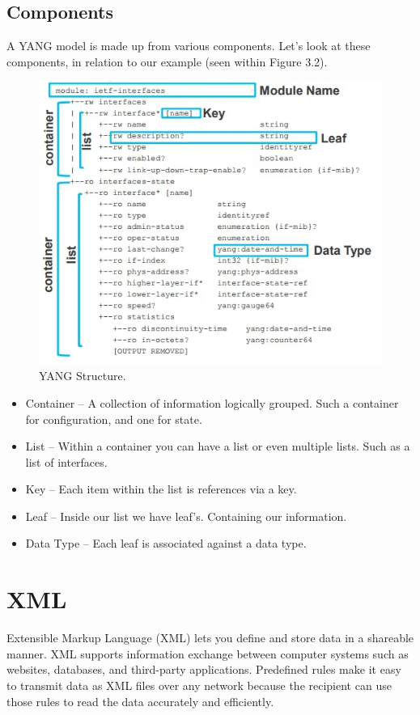 \subsection*{Components}
A YANG model is made up from various components. Let’s look at these components, in relation to our example (seen within Figure 3.2).

\begin{figure}[h]
    \centering
    \includegraphics[width=0.7\linewidth]{Images/yang.jpg}
    \caption{YANG Structure.}
    \label{fig:example}
\end{figure}


\begin{itemize}
    \item Container – A collection of information logically grouped. Such a container for configuration, and one for state.
    \item List – Within a container you can have a list or even multiple lists. Such as a list of interfaces.
    \item Key – Each item within the list is references via a key.
    \item Leaf – Inside our list we have leaf’s. Containing our information.
    \item Data Type – Each leaf is associated against a data type.
\end{itemize}

\section{XML}
Extensible Markup Language (XML) lets you define and store data in a shareable manner. XML supports information exchange between computer systems such as websites, databases, and third-party applications. Predefined rules make it easy to transmit data as XML files over any network because the recipient can use those rules to read the data accurately and efficiently.

